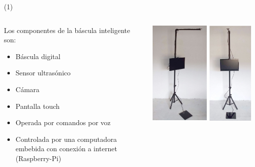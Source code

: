 



\begin{frame}{ \footnotemark (1)}
\begin{columns}
\begin{column}{0.6\textwidth}
Los componentes de la báscula inteligente son:
	\begin{itemize}
\item Báscula digital
\item Sensor ultrasónico
\item Cámara
\item Pantalla touch
\item Operada por comandos por voz
\item Controlada por una computadora embebida con conexión a internet (Raspberry-Pi)
	\end{itemize}
\end{column}
\begin{column}{0.4\textwidth}
\begin{center}
     \includegraphics[width=0.99\textwidth]{Figs/Bascula1}
     \end{center}
\end{column}

\end{columns}
\setcounter{footnote}{0}
\end{frame}

